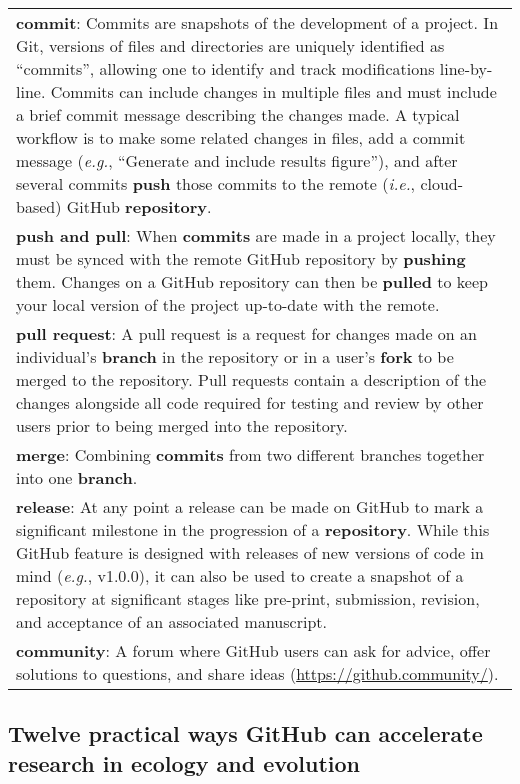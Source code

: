 \begin{tablenos:no-prefix-table-caption}
\begin{longtable}[]{@{}
  >{\raggedright\arraybackslash}p{}@{}}
\textbf{commit}: Commits are snapshots of the development of a project. In Git, versions of files and directories are uniquely identified as ``commits'', allowing one to identify and track modifications line-by-line. Commits can include changes in multiple files and must include a brief commit message describing the changes made. A typical workflow is to make some related changes in files, add a commit message (\emph{e.g.}, ``Generate and include results figure''), and after several commits \textbf{push} those commits to the remote (\emph{i.e.}, cloud-based) GitHub \textbf{repository}. \\
\textbf{push and pull}: When \textbf{commits} are made in a project locally, they must be synced with the remote GitHub repository by \textbf{pushing} them. Changes on a GitHub repository can then be \textbf{pulled} to keep your local version of the project up-to-date with the remote. \\
\textbf{pull request}: A pull request is a request for changes made on an individual's \textbf{branch} in the repository or in a user's \textbf{fork} to be merged to the repository. Pull requests contain a description of the changes alongside all code required for testing and review by other users prior to being merged into the repository. \\
\textbf{merge}: Combining \textbf{commits} from two different branches together into one \textbf{branch}. \\
\textbf{release}: At any point a release can be made on GitHub to mark a significant milestone in the progression of a \textbf{repository}. While this GitHub feature is designed with releases of new versions of code in mind (\emph{e.g.}, v1.0.0), it can also be used to create a snapshot of a repository at significant stages like pre-print, submission, revision, and acceptance of an associated manuscript. \\
\textbf{community}: A forum where GitHub users can ask for advice, offer solutions to questions, and share ideas (\url{https://github.community/}). \\
\bottomrule
\end{longtable}

\end{tablenos:no-prefix-table-caption}

\hypertarget{twelve-practical-ways-github-can-accelerate-research-in-ecology-and-evolution}{%
\subsection{Twelve practical ways GitHub can accelerate research in ecology and evolution}\label{twelve-practical-ways-github-can-accelerate-research-in-ecology-and-evolution}}

